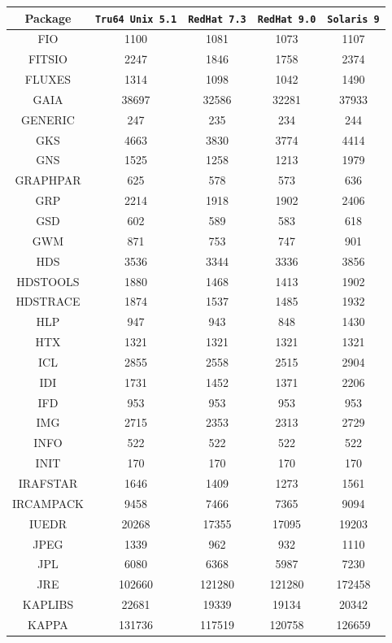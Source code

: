 \documentclass[twoside,11pt]{article}
\renewcommand{\_}{\texttt{\symbol{95}}}
\begin{document}
\begin{table}[p]
\begin{center}
\begin{tabular}{|c|c|c|c|c|}
\hline \hline
\textbf{Package} & \texttt{Tru64 Unix 5.1} & \texttt{RedHat 7.3} & \texttt{RedHat 9.0} & \texttt{Solaris 9} \\ \hline \hline
\hline
FIO & 1100 & 1081 & 1073 & 1107 \\
FITSIO & 2247 & 1846 & 1758 & 2374 \\
FLUXES & 1314 & 1098 & 1042 & 1490 \\
GAIA & 38697 & 32586 & 32281 & 37933 \\
GENERIC & 247 & 235 & 234 & 244 \\
GKS & 4663 & 3830 & 3774 & 4414 \\
GNS & 1525 & 1258 & 1213 & 1979 \\
GRAPHPAR & 625 & 578 & 573 & 636 \\
GRP & 2214 & 1918 & 1902 & 2406 \\
GSD & 602 & 589 & 583 & 618 \\
GWM & 871 & 753 & 747 & 901 \\
HDS & 3536 & 3344 & 3336 & 3856 \\
HDSTOOLS & 1880 & 1468 & 1413 & 1902 \\
HDSTRACE & 1874 & 1537 & 1485 & 1932 \\
HLP & 947 & 943 & 848 & 1430 \\
HTX & 1321 & 1321 & 1321 & 1321 \\
ICL & 2855 & 2558 & 2515 & 2904 \\
IDI & 1731 & 1452 & 1371 & 2206 \\
IFD & 953 & 953 & 953 & 953 \\
IMG & 2715 & 2353 & 2313 & 2729 \\
INFO & 522 & 522 & 522 & 522 \\
INIT & 170 & 170 & 170 & 170 \\
IRAFSTAR & 1646 & 1409 & 1273 & 1561 \\
IRCAMPACK & 9458 & 7466 & 7365 & 9094 \\
IUEDR & 20268 & 17355 & 17095 & 19203 \\
JPEG & 1339 & 962 & 932 & 1110 \\
JPL & 6080 & 6368 & 5987 & 7230 \\
JRE & 102660 & 121280 & 121280 & 172458 \\
KAPLIBS & 22681 & 19339 & 19134 & 20342 \\
KAPPA & 131736 & 117519 & 120758 & 126659 \\

\end{tabular}
\end{center}
\end{table}
\end{document}
